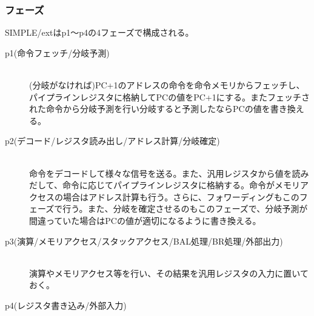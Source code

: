 \documentclass{jarticle}
\begin{document}
\subsubsection{フェーズ}
\hspace{10pt}SIMPLE/extはp1～p4の4フェーズで構成される。
\begin{description}
\item[p1(命令フェッチ/分岐予測)] \leavevmode \\
(分岐がなければ)PC+1のアドレスの命令を命令メモリからフェッチし、パイプラインレジスタに格納してPCの値をPC+1にする。またフェッチされた命令から分岐予測を行い分岐すると予測したならPCの値を書き換える。
\item[p2(デコード/レジスタ読み出し/アドレス計算/分岐確定)] \leavevmode \\
命令をデコードして様々な信号を送る。また、汎用レジスタから値を読みだして、命令に応じてパイプラインレジスタに格納する。命令がメモリアクセスの場合はアドレス計算も行う。さらに、フォワーディングもこのフェーズで行う。また、分岐を確定させるのもこのフェーズで、分岐予測が間違っていた場合はPCの値が適切になるように書き換える。
\item[p3(演算/メモリアクセス/スタックアクセス/BAL処理/BR処理/外部出力)] \leavevmode \\
演算やメモリアクセス等を行い、その結果を汎用レジスタの入力に置いておく。
\item[p4(レジスタ書き込み/外部入力)] \leavevmode \\
\end{description}
\end{document}
